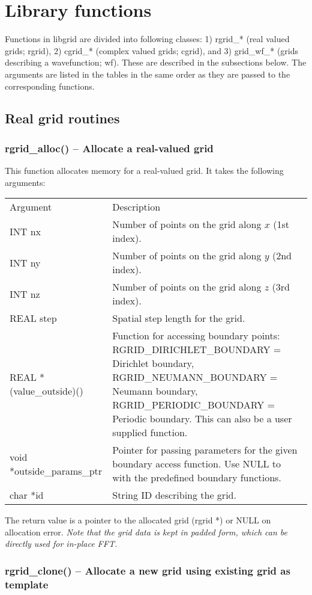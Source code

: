 \documentclass[12pt,letterpaper]{report}
\begin{document}
\chapter{Library functions}

Functions in libgrid are divided into following classes: 1) rgrid\_* (real valued grids; rgrid), 2) cgrid\_* (complex valued grids; cgrid), and 3) grid\_wf\_* (grids describing a wavefunction; wf). These are described in the subsections below. The arguments are listed in the tables in the same order as they are passed to the corresponding functions.

\section{Real grid routines}

\subsection{rgrid\_alloc() -- Allocate a real-valued grid}

This function allocates memory for a real-valued grid. It takes the following arguments:
\begin{longtable}{p{} p{}}
Argument & Description\\
\cline{1-2}
INT nx & Number of points on the grid along $x$ (1st index).\\
INT ny & Number of points on the grid along $y$ (2nd index).\\
INT nz & Number of points on the grid along $z$ (3rd index).\\
REAL step & Spatial step length for the grid.\\
REAL *(value\_outside)() & Function for accessing boundary points: RGRID\_DIRICHLET\_BOUNDARY = Dirichlet boundary, RGRID\_NEUMANN\_BOUNDARY = Neumann boundary, RGRID\_PERIODIC\_BOUNDARY  = Periodic boundary. This can also be a user supplied function.\\
void *outside\_params\_ptr & Pointer for passing parameters for the given boundary access function. Use NULL to with the predefined boundary functions.\\
char *id & String ID describing the grid.
\end{longtable}
\noindent
The return value is a pointer to the allocated grid (rgrid *) or NULL on allocation error. \textit{Note that the grid data is kept in padded form, which can be directly used for in-place FFT.}

\subsection{rgrid\_clone() -- Allocate a new grid using existing grid as template}
\end{document}
